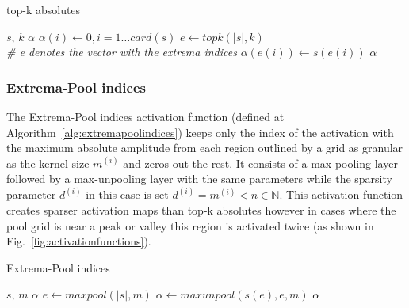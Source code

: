 \documentclass[journal]{IEEEtran}
\begin{document}
\begin{algorithm}[H]
	\caption{top-k absolutes}
	\label{alg:topkabsolutes}
	\begin{algorithmic}[1]
		\renewcommand{\algorithmicrequire}{\textbf{Input:}}
		\renewcommand{\algorithmicensure}{\textbf{Output:}}
		\REQUIRE $s$, $k$
		\ENSURE $\alpha$
		\STATE $\alpha(i) \leftarrow 0, i=1\ldots card(s)$
		\STATE $e \leftarrow topk(\lvert s\rvert, k)$
		\\\textit{\scriptsize \# e denotes the vector with the extrema indices}
		\STATE $\alpha(e(i)) \leftarrow s(e(i))$
		\ENDFOR
		\RETURN $\alpha$
	\end{algorithmic}
\end{algorithm}

\subsubsection{Extrema-Pool indices}
\label{sec:extremapoolindices}
The Extrema-Pool indices activation function (defined at Algorithm~\ref{alg:extremapoolindices}) keeps only the index of the activation with the maximum absolute amplitude from each region outlined by a grid as granular as the kernel size $m^{(i)}$ and zeros out the rest.
It consists of a max-pooling layer followed by a max-unpooling layer with the same parameters while the sparsity parameter $d^{(i)}$ in this case is set $d^{(i)} = m^{(i)} < n \in \mathbb{N}$.
This activation function creates sparser activation maps than top-k absolutes however in cases where the pool grid is near a peak or valley this region is activated twice (as shown in Fig.~\ref{fig:activationfunctions}).

\begin{algorithm}[H]
	\caption{Extrema-Pool indices}
	\label{alg:extremapoolindices}
	\begin{algorithmic}[1]
		\renewcommand{\algorithmicrequire}{\textbf{Input:}}
		\renewcommand{\algorithmicensure}{\textbf{Output:}}
		\REQUIRE $s$, $m$
		\ENSURE $\alpha$
		\STATE $e \leftarrow maxpool(\lvert s\rvert, m)$
		\STATE $\alpha \leftarrow maxunpool(s(e), e, m)$
		\RETURN $\alpha$
	\end{algorithmic}
\end{algorithm}
\end{document}
